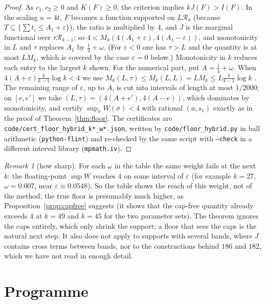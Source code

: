 \documentclass[11pt]{amsart}
\theoremstyle{definition}
\theoremstyle{remark}
\newtheorem{remark}[theorem]{Remark}
\newcommand{\R}{\mathcal{R}}
\begin{document}
\begin{proof}
As $c_1,c_2\ge0$ and $K(F)\ge0$, the criterion implies $kJ(F)>I(F)$. In the
scaling $u=4t$, $F$ becomes a function supported on $L\R_k$ (because
$T\subseteq\{\sum t_i\le A_1+\varepsilon\}$), the ratio is multiplied by $4$,
and $J$ is the marginal functional over $\tau\R_{k-1}$; so
$4<M_k(4(A_1+\varepsilon),4(A_1-\varepsilon))$, and monotonicity in $L$ and
$\tau$ replaces $A_1$ by $\frac14+\omega$. (For $\varepsilon<0$ one has
$\tau>L$ and the quantity is at most $LM_k$, which is covered by the case
$\varepsilon=0$ below.) Monotonicity in $k$ reduces each entry to the largest
$k$ shown. For the numerical part, put $A=\frac14+\omega$. When
$4(A+\varepsilon)\frac{k}{k-1}\log k<4$ we use
$M_k(L,\tau)\le M_k(L,L)=LM_k\le L\frac{k}{k-1}\log k$
\cite[Cor.~6.4]{Pol14b}. The remaining range of $\varepsilon$, up to $A$, is
cut into intervals of length at most $1/2000$; on $[e,e']$ we take
$(L,\tau)=(4(A+e'),4(A-e))$, which dominates by monotonicity, and certify
$\sup_\sigma W(\sigma)<4$ with rational $(a,s_1)$ exactly as in the proof of
Theorem~\ref{thm:floor}. The certificates are
\texttt{code/cert\_floor\_hybrid\_k*\_w*.json}, written by
\texttt{code/floor\_hybrid.py} in ball arithmetic (\texttt{python-flint}) and
re-checked by the same script with \texttt{--check} in a different interval
library (\texttt{mpmath.iv}).
\end{proof}

\begin{remark}[how sharp]
For each $\omega$ in the table the same weight fails at the next $k$: the
floating-point $\sup W$ reaches $4$ on some interval of $\varepsilon$ (for
example $k=27$, $\omega=0.007$, near $\varepsilon\approx0.0548$). So the table
shows the reach of this weight, not of the method; the true floor is
presumably much higher, as Proposition~\ref{prop:capfree} suggests (it shows
that the cap-free quantity already exceeds $4$ at $k=49$ and $k=45$ for the two
parameter sets). The theorem ignores the caps entirely, which only shrink the
support; a floor that sees the caps is the natural next step. It also does not
apply to supports with several bands, where $J$ contains cross terms between
bands, nor to the constructions behind $186$ and $182$, which we have not
read in enough detail.
\end{remark}

\section{Programme}\label{sec:prog}
\end{document}
